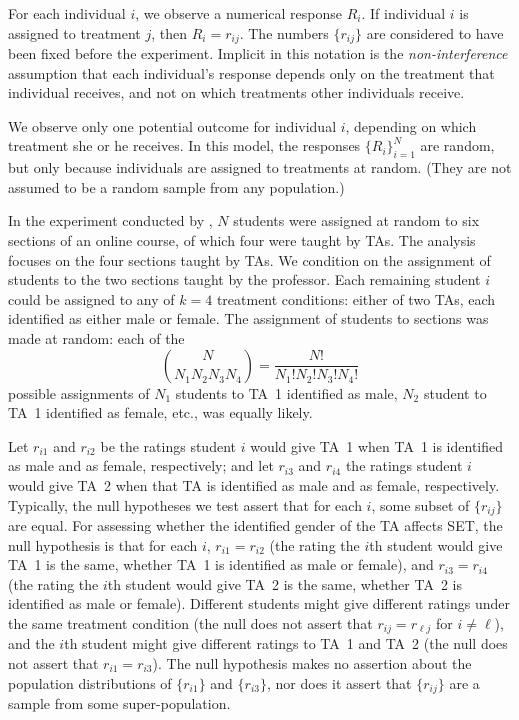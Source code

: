 \documentclass[12pt]{article}
\newcommand{\beq}{\begin{equation}}
\newcommand{\eeq}{\end{equation}}
\begin{document}
For each individual $i$, we observe a numerical response $R_i$.
If individual $i$ is assigned to treatment $j$, then $R_i = r_{ij}$.
The numbers $\{r_{ij}\}$ are considered to have been fixed before the experiment.
Implicit in this notation is the \emph{non-interference} assumption that
each individual's response depends only on the treatment that individual receives, 
and not on which treatments other individuals receive.

We observe only one potential outcome for individual $i$, 
depending on which treatment she or he receives.
In this model, the responses $\{R_i\}_{i=1}^N$ are random, but only because 
individuals are assigned to treatments at random.
(They are not assumed to be a random sample from any population.)

In the experiment conducted by \citet{MacNell2014},
$N$ students were assigned at random to six sections of an online course,
of which four were taught by TAs.
The analysis focuses on the four sections taught by TAs.
We condition on the assignment of students to the two sections taught by the professor.
Each remaining student $i$ could be assigned to any of $k=4$ treatment conditions:
either of two TAs, each identified as either male or female.
The assignment of students to sections was made at random: each of the
\beq
 {{N}\choose{N_1 N_2 N_3 N_4}} = \frac{N!}{N_1! N_2! N_3! N_4!}
\eeq
possible assignments of $N_1$ students to TA~1 identified as male,
$N_2$ student to TA~1 identified as female, etc., was equally likely.

Let $r_{i1}$ and $r_{i2}$ be the ratings student $i$ would give TA~1 when 
TA~1 is identified as male and as female, respectively; and let 
$r_{i3}$ and $r_{i4}$ the ratings student $i$ would give TA~2 when that TA
is identified as male and as female, respectively.
Typically, the null hypotheses we test assert that for each $i$, some subset of
$\{r_{ij}\}$ are  equal.
For assessing whether the identified gender of the TA affects SET,
the null hypothesis is that for each $i$,
$r_{i1} = r_{i2}$ (the rating the $i$th student would give TA~1 is the same,
whether TA~1 is identified as male or female), 
and $r_{i3} = r_{i4}$ (the rating the $i$th student would give TA~2 is
the same, whether TA~2 is identified as male or female).
Different students might give different ratings under the same treatment condition
(the null does not assert that $r_{ij} = r_{\ell j}$ for $i \ne \ell$), and
the $i$th student might 
give different ratings to TA~1 and TA~2
(the null does not assert that $r_{i1} = r_{i3}$).
The null hypothesis makes no assertion about the population distributions of 
$\{r_{i1}\}$ and $\{r_{i3}\}$, nor does it assert that $\{r_{ij}\}$ are 
a sample from some super-population.
\end{document}
